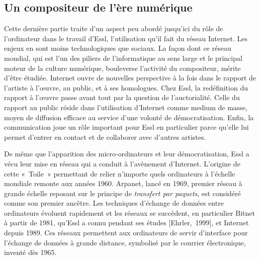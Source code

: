 \documentclass[a4paper,12pt]{article}
\newcommand{\guill}[1]{«~#1~»}
\newcommand{\cicite}[1]{{\footnotesize[#1]}}
\begin{document}
\subsection{Un compositeur de l'ère numérique}
\label{internet}

Cette dernière partie traite d'un aspect peu abordé jusqu'ici du rôle de l'ordinateur dans le travail d'Essl, l'utilisation qu'il fait du réseau Internet. Les enjeux en sont moins technologiques que sociaux. La façon dont ce réseau mondial, qui est l'un des piliers de l'informatique au sens large et le principal moteur de la culture numérique, bouleverse l'activité du compositeur, mérite d'être étudiée. Internet ouvre de nouvelles perspective à la fois dans le rapport de l'artiste à l'œuvre, au public, et à ses homologues. Chez Essl, la redéfinition du rapport à l'œuvre passe avant tout par la question de l'auctorialité. Celle du rapport au public réside dans l'utilisation d'Internet comme medium de masse, moyen de diffusion efficace au service d'une volonté de démocratisation. Enfin, la communication joue un rôle important pour Essl en particulier parce qu'elle lui permet d'entrer en contact et de collaborer avec d'autres artistes.

De même que l'apparition des micro-ordinateurs et leur démocratisation, Essl a vécu leur mise en réseau qui a conduit à l'avènement d'Internet. L'origine de cette \guill{Toile} permettant de relier n'importe quels ordinateurs à l'échelle mondiale remonte aux années 1960. Arpanet, lancé en 1969, premier réseau à grande échelle reposant sur le principe de \emph{transfert par paquets}, est considéré comme son premier ancêtre. Les techniques d'échange de données entre ordinateurs évoluent rapidement et les réseaux se succèdent, en particulier Bitnet à partir de 1981, qu'Essl a connu pendant ses études \cicite{Ehrler,~1999}, et Internet depuis 1989. Ces réseaux permettent aux ordinateurs de servir d'interface pour l'échange de données à grande distance, symbolisé par le courrier électronique, inventé dès 1965.
\end{document}
